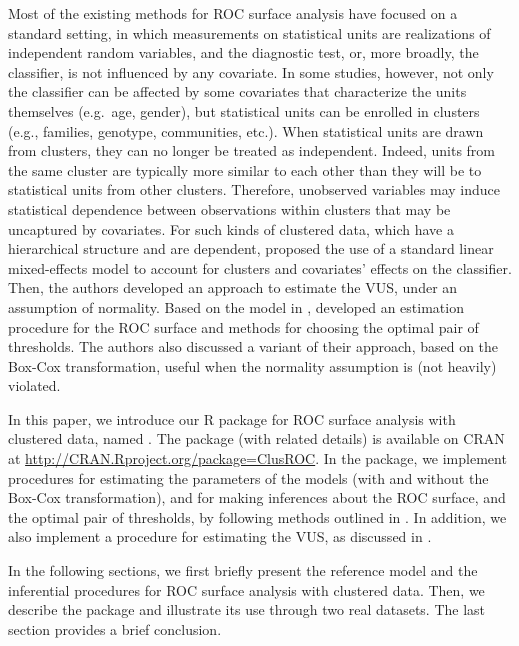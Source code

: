 Most of the existing methods for ROC surface analysis have focused on a standard setting, in which measurements on statistical units are realizations of independent random variables, and the diagnostic test, or, more broadly, the classifier, is not influenced by any covariate. In some studies, however, not only the classifier can be affected by some covariates that characterize the units themselves (e.g.~age, gender), but statistical units can be enrolled in clusters (e.g., families, genotype, communities, etc.). When statistical units are drawn from clusters, they can no longer be treated as independent. Indeed, units from the same cluster are typically more similar to each other than they will be to statistical units from other clusters. Therefore, unobserved variables may induce statistical dependence between observations within clusters that may be uncaptured by covariates. For such kinds of clustered data, which have a hierarchical structure and are dependent, \citet{xiong2018estimating} proposed the use of a standard linear {mixed-effects} model \citep{mcculloch2004generalized} to account for clusters and covariates' effects on the {classifier}. Then, the authors developed an approach to estimate the VUS, under an assumption of normality. Based on the model in \citet{xiong2018estimating}, \citet{khanh2022} developed an estimation procedure for the ROC surface and methods for choosing the optimal pair of thresholds. The authors also discussed a variant of their approach, based on the Box-Cox transformation, useful when the normality assumption is (not heavily) violated.

In this paper, we introduce our R package for ROC surface analysis with clustered data, named . The package (with related details) is available on CRAN at \url{http://CRAN.Rproject.org/package=ClusROC}. In the package, we implement procedures for estimating the parameters of the models (with and without the Box-Cox transformation), and for making inferences about the ROC surface, and the optimal pair of thresholds, by following methods outlined in \citet{khanh2022}. In addition, we also implement a procedure for estimating the VUS, as discussed in \citet{xiong2018estimating}.

In the following sections, we first briefly present the reference model and the inferential procedures for ROC surface analysis with clustered data. Then, we describe the  package and illustrate its use through two real datasets. The last section provides a brief conclusion.

